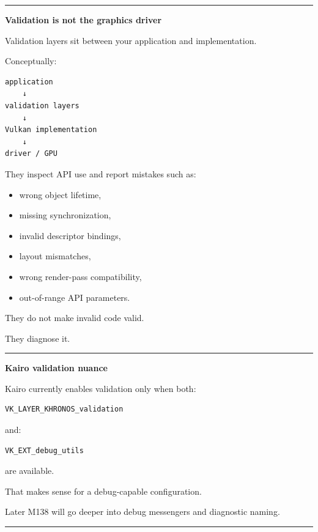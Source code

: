 \begin{center}\rule{0.5\linewidth}{0.5pt}\end{center}

\textbf{Validation is not the graphics driver}

Validation layers sit between your application and implementation.

Conceptually:

\begin{verbatim}
application
    ↓
validation layers
    ↓
Vulkan implementation
    ↓
driver / GPU
\end{verbatim}

They inspect API use and report mistakes such as:

\begin{itemize}
\tightlist
\item
  wrong object lifetime,
\item
  missing synchronization,
\item
  invalid descriptor bindings,
\item
  layout mismatches,
\item
  wrong render-pass compatibility,
\item
  out-of-range API parameters.
\end{itemize}

They do not make invalid code valid.

They diagnose it.

\begin{center}\rule{0.5\linewidth}{0.5pt}\end{center}

\textbf{Kairo validation nuance}

Kairo currently enables validation only when both:

\begin{verbatim}
VK_LAYER_KHRONOS_validation
\end{verbatim}

and:

\begin{verbatim}
VK_EXT_debug_utils
\end{verbatim}

are available.

That makes sense for a debug-capable configuration.

Later M138 will go deeper into debug messengers and diagnostic naming.

\begin{center}\rule{0.5\linewidth}{0.5pt}\end{center}

